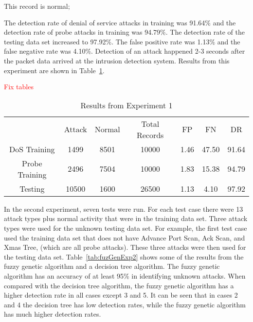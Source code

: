 \documentclass{sig-alternate}
\newcommand{\mycomment}[1]{\textcolor{red}{#1}}
\begin{document}
   This record is normal;



The detection rate of denial of service attacks in training was 91.64\% and the detection rate of probe attacks in training was 94.79\%. The detection rate of the testing data set increased to 97.92\%. The false positive rate was 1.13\% and the false negative rate was 4.10\%. Detection of an attack happened 2-3 seconds after the packet data arrived at the intrusion detection system. Results from this experiment are shown in Table~\ref{tab:fuzGenExp1}.

\mycomment{Fix tables}

\begin{table}
\caption{Results from Experiment 1}
\begin{tabular}{|ccccccc|} \hline
 & Attack & Normal & Total Records & FP & FN & DR\\
DoS Training & 1499 & 8501 & 10000 & 1.46 & 47.50 & 91.64\\
Probe Training & 2496 & 7504 & 10000 & 1.83 & 15.38 & 94.79\\
Testing & 10500 & 1600 & 26500 & 1.13 & 4.10 & 97.92\\
\hline\end{tabular}
\label{tab:fuzGenExp1}
\end{table}

In the second experiment, seven tests were run. For each test case there were 13 attack types plus normal activity that were in the training data set. Three attack types were used for the unknown testing data set. For example, the first test case used the training data set that does not have Advance Port Scan, Ack Scan, and Xmas Tree, (which are all probe attacks). These three attacks were then used for the testing data set. Table~\ref{tab:fuzGenExp2} shows some of the results from the fuzzy genetic algorithm and a decision tree algorithm. The fuzzy genetic algorithm has an accuracy of at least 95\% in identifying unknown attacks. When compared with the decision tree algorithm, the fuzzy genetic algorithm has a higher detection rate in all cases except 3 and 5. It can be seen that in cases 2 and 4 the decision tree has low detection rates, while the fuzzy genetic algorithm has much higher detection rates.
\end{document}
